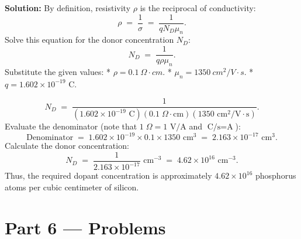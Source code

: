 \documentclass[12pt, a4paper]{book}
\begin{document}
\begin{problembox}
\begin{enumerate}[label=\textbf{E\arabic*.}]
        \textbf{Solution:}
        By definition, resistivity $\rho$ is the reciprocal of conductivity:
        \[
          \rho \;=\; \frac{1}{\sigma} \;=\; \frac{1}{q N_D \mu_n}.
        \]
        Solve this equation for the donor concentration $N_D$:
        \[
          N_D \;=\; \frac{1}{q \rho \mu_n}.
        \]
        Substitute the given values:
        * $\rho = \SI{0.1}{\Omega\cdot cm}$.
        * $\mu_n = \SI{1350}{cm^2/V\cdot s}$.
        * $q = 1.602 \times 10^{-19}$ C.
        
        \[
          N_D \;=\; \frac{1}{\left( 1.602 \times 10^{-19} \text{ C} \right) \left( 0.1 \;\Omega\cdot\text{cm} \right) \left( 1350 \text{ cm}^2/\text{V}\cdot\text{s} \right)}.
        \]
        Evaluate the denominator (note that $1 \;\Omega = 1 \text{ V/A}$ and $\text{C/s} = \text{A}$):
        \[
          \text{Denominator} \;=\; 1.602 \times 10^{-19} \times 0.1 \times 1350 \text{ cm}^3 \;=\; 2.163 \times 10^{-17} \text{ cm}^3.
        \]
        Calculate the donor concentration:
        \[
          N_D \;=\; \frac{1}{2.163 \times 10^{-17}} \text{ cm}^{-3} \;=\; 4.62 \times 10^{16} \text{ cm}^{-3}.
        \]
        Thus, the required dopant concentration is approximately $4.62 \times 10^{16}$ phosphorus atoms per cubic centimeter of silicon.
\end{enumerate}
\end{problembox}

\newpage

\section{Part 6 --- Problems}
\end{document}
